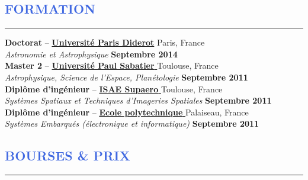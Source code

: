\documentclass[11pt, a4paper, french]{article}
\begin{document}

\vspace{-0.3cm}
\textcolor{RoyalBlue}{\section{\large FORMATION}
\vspace{-0.2cm}\hrule}
\vspace{0.4cm}

{\bf Doctorat} -- \href{https://www.univ-paris-diderot.fr/}{\textbf{Universit\'e Paris Diderot}}
\hfill Paris, France\\
{\small \it Astronomie et Astrophysique} \hfill  {\small \bf Septembre 2014}\\

\vspace{-0.05cm}
{\bf Master 2} --
\href{http://ezomp2.omp.obs-mip.fr/asep/index.php/fre}{\textbf{Université Paul Sabatier} }
 \hfill Toulouse, France\\
{\small \it Astrophysique, Science de l'Espace, Planétologie} \hfill { \small \bf Septembre 2011}\\

\vspace{-0.05cm}
{\bf Diplôme d'ingénieur} -- \href{https://www.isae-supaero.fr/}{\textbf{\textbf{ISAE Supaero} }}  \hfill Toulouse, France\\
{\small \it Systèmes Spatiaux et Techniques d'Imageries Spatiales} \hfill { \small \bf Septembre 2011}\\


\vspace{-0.05cm}
{\bf Diplôme d'ingénieur} --
\href{http://www.polytechnique.edu/}{\textbf{\textbf{Ecole polytechnique} }}
\hfill Palaiseau, France  \\
{\small \it Systèmes Embarqués (électronique et informatique)}   \hfill {\small \bf Septembre 2011}\\


\vspace{-0.3cm}
\textcolor{RoyalBlue}{\section{\large BOURSES \& PRIX}
\vspace{-0.2cm}\hrule}
\vspace{0.4cm}
\end{document}
